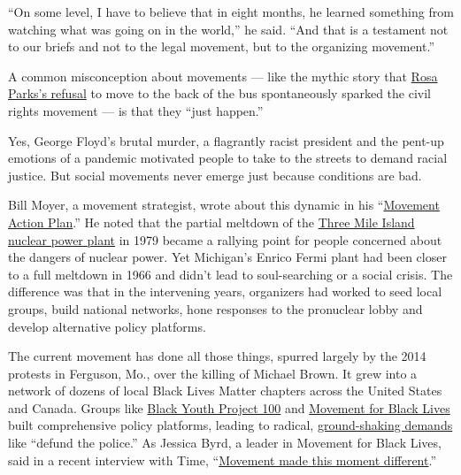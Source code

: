 ``On some level, I have to believe that in eight months, he learned
something from watching what was going on in the world,'' he said. ``And
that is a testament not to our briefs and not to the legal movement, but
to the organizing movement.''

A common misconception about movements --- like the mythic story that
\href{https://genprogress.org/the-myth-of-rosa-parks/}{Rosa Parks's
refusal} to move to the back of the bus spontaneously sparked the civil
rights movement --- is that they ``just happen.''

Yes, George Floyd's brutal murder, a flagrantly racist president and the
pent-up emotions of a pandemic motivated people to take to the streets
to demand racial justice. But social movements never emerge just because
conditions are bad.

Bill Moyer, a movement strategist, wrote about this dynamic in his
``\href{https://www.indybay.org/olduploads/movement_action_plan.pdf}{Movement
Action Plan}.'' He noted that the partial meltdown of the
\href{https://www.nytimes3xbfgragh.onion/1979/04/16/archives/three-mile-island-notes-from-a-nightmare-three-mile-island-a.html}{Three
Mile Island nuclear power plant} in 1979 became a rallying point for
people concerned about the dangers of nuclear power. Yet Michigan's
Enrico Fermi plant had been closer to a full meltdown in 1966 and didn't
lead to soul-searching or a social crisis. The difference was that in
the intervening years, organizers had worked to seed local groups, build
national networks, hone responses to the pronuclear lobby and develop
alternative policy platforms.

The current movement has done all those things, spurred largely by the
2014 protests in Ferguson, Mo., over the killing of Michael Brown. It
grew into a network of dozens of local Black Lives Matter chapters
across the United States and Canada. Groups like
\href{http://agendatobuildblackfutures.org/wp-content/uploads/2016/01/BYP_AgendaBlackFutures_booklet_web.pdf}{Black
Youth Project 100} and
\href{https://m4bl.org/policy-platforms/}{Movement for Black Lives}
built comprehensive policy platforms, leading to radical,
\href{https://mavenroundtable.io/rinkusen/politics/why-defundthepolice-is-genius-strategy-ZNTk0AGz3kOxAwIqj2BTEg}{ground-shaking
demands} like ``defund the police.'' As Jessica Byrd, a leader in
Movement for Black Lives, said in a recent interview with Time,
``\href{https://time.com/5847506/time-100-talks-black-lives-matter/}{Movement
made this moment different}.''


